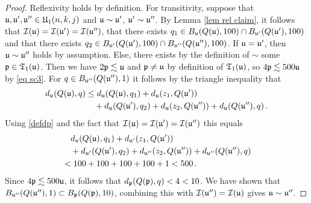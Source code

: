 \begin{proof}
    Reflexivity holds by definition.
    For transitivity, suppose that $\mathfrak u, \mathfrak u', \mathfrak u'' \in \mathfrak U_1(n,k,j)$ and $\mathfrak u \sim \mathfrak u'$, $\mathfrak u' \sim \mathfrak u''$.
    By Lemma \eqref{lem rel claim}, it follows that $\mathcal{I}(\mathfrak u) =\mathcal{I}(\mathfrak u') = \mathcal{I}(\mathfrak u'')$, that there exists $q_1 \in B_{\mathfrak u}(Q(\mathfrak u), 100) \cap B_{\mathfrak u'}(Q(\mathfrak u'), 100)$ and that there exists $q_2 \in B_{\mathfrak u'}(Q(\mathfrak u'), 100) \cap B_{\mathfrak u''}(Q(\mathfrak u''), 100)$. If $\mathfrak u = \mathfrak u'$, then $\mathfrak u \sim \mathfrak u''$ holds by assumption. Else, there exists by the definition of $\sim$ some $\mathfrak p \in \mathfrak{T}_1(\mathfrak u)$.
    Then we have $2\mathfrak p \lesssim \mathfrak u$  and $\mathfrak p \ne \mathfrak u$ by definition of $\mathfrak{T}_1(\mathfrak u)$,  so $4 \mathfrak p \lesssim 500 \mathfrak u$ by \eqref{eq sc3}. For $q \in B_{\mathfrak u''}(Q(\mathfrak u''), 1)$ it follows by the triangle inequality that
    \begin{align*}
        d_{\mathfrak u}(Q(\mathfrak u), q) &\le d_{\mathfrak u}(Q(\mathfrak u), q_1) + d_{\mathfrak u}(z_1, Q(\mathfrak u'))\\
        &\quad+ d_{\mathfrak u}(Q(\mathfrak u'), q_2) + d_{\mathfrak u}(z_2, Q(\mathfrak u'')) +
        d_{\mathfrak u}(Q(\mathfrak u''), q)\,.
    \end{align*}
    Using \eqref{defdp} and the fact that $\mathcal{I}(\mathfrak u) = \mathcal{I}(\mathfrak u') = \mathcal{I}(\mathfrak u'')$ this equals
    \begin{align*}
        &\quad d_{\mathfrak u}(Q(\mathfrak u), q_1) + d_{\mathfrak u'}(z_1, Q(\mathfrak u'))\\
        &\quad+ d_{\mathfrak u'}(Q(\mathfrak u'), q_2) + d_{\mathfrak u''}(z_2, Q(\mathfrak u'')) +
        d_{\mathfrak u''}(Q(\mathfrak u''), q)\\
        &< 100 + 100 + 100 + 100 + 1 < 500\,.
    \end{align*}
    Since $4\mathfrak p \lesssim 500 \mathfrak u$, it follows that $d_{\mathfrak p}(Q(\mathfrak p), q) < 4 < 10$. We have shown that $B_{\mathfrak u''}(Q(\mathfrak u''), 1) \subset B_{\mathfrak p}(Q(\mathfrak p), 10)$, combining this with $\mathcal{I}(\mathfrak u'') = \mathcal{I}(\mathfrak u)$ gives $\mathfrak u \sim \mathfrak u''$.


\end{proof}
